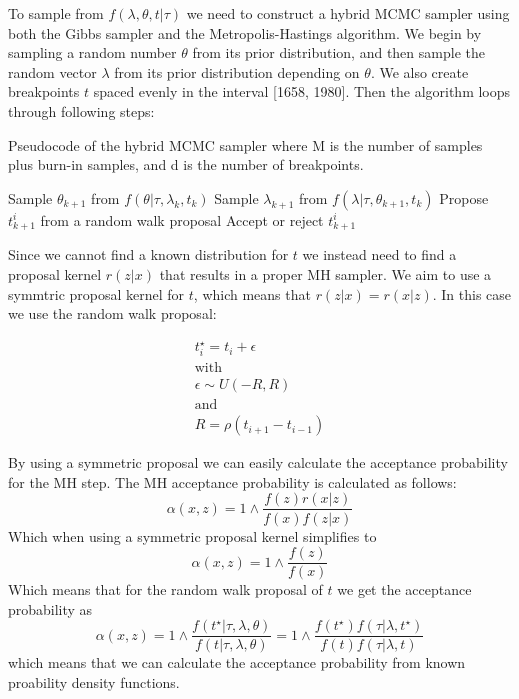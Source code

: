 \documentclass[a4paper]{article}
\begin{document}
To sample from $f(\lambda, \theta, t | \tau)$ we need to construct a hybrid MCMC sampler using both the Gibbs sampler and the Metropolis-Hastings algorithm. We begin by sampling a random number $\theta$ from its prior distribution, and then sample the random vector \textbf{$\lambda$} from its prior distribution depending on $\theta$. We also create breakpoints $t$ spaced evenly in the interval [1658, 1980]. Then the algorithm loops through following steps:

\begin{algorithm}
    \caption{Pseudocode of the hybrid MCMC sampler where M is the number of samples plus burn-in samples, and d is the number of breakpoints.}
    \begin{algorithmic}
        \State Sample $\theta_{k+1}$ from $f(\theta|\tau, \lambda_k, t_k)$
        \State Sample $\lambda_{k+1}$ from $f(\lambda|\tau, \theta_{k+1}, t_k)$
        \State Propose $t_{k+1}^i$ from a random walk proposal
        \State Accept or reject $t_{k+1}^i$
        \EndFor
        \EndFor
    \end{algorithmic}
\end{algorithm}

Since we cannot find a known distribution for $t$ we instead need to find a proposal kernel $r(z|x)$ that results in a proper MH sampler. We aim to use a symmtric proposal kernel for $t$, which means that $r(z|x) = r(x|z)$. In this case we use the random walk proposal:

\begin{equation}
    \label{eq:proposal_kernel}
    \begin{gathered}
        t_i^\star = t_i + \epsilon \\
        \text{with} \\
        \epsilon \sim U(-R,R) \\
        \text{and} \\
        R = \rho(t_{i+1}-t_{i-1})
    \end{gathered}
\end{equation}

By using a symmetric proposal we can easily calculate the acceptance probability for the MH step. The MH acceptance probability is calculated as follows:
\begin{equation}
    \alpha(x,z) = 1 \wedge \frac{f(z)r(x|z)}{f(x)f(z|x)}
\end{equation}
Which when using a symmetric proposal kernel simplifies to
\begin{equation}
    \alpha(x,z) = 1 \wedge \frac{f(z)}{f(x)}
\end{equation}
Which means that for the random walk proposal of $t$ we get the acceptance probability as
\begin{equation}
    \alpha(x,z) = 1 \wedge \frac{f(t^\star | \tau, \lambda, \theta)}{f(t | \tau, \lambda, \theta)} = 1 \wedge \frac{f(t^\star)f(\tau|\lambda,t^\star)}{f(t)f(\tau|\lambda,t)}
\end{equation}
which means that we can calculate the acceptance probability from known proability density functions.
\end{document}
